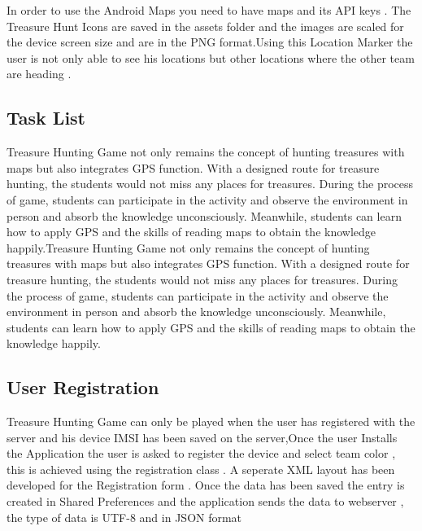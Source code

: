 \documentclass[11.4pt,a4paper,times]{report}
\begin{document}
In order to use the Android Maps you need to have maps and its API keys . The Treasure Hunt Icons are saved in the assets folder and the images are scaled for the device screen size and are in the PNG format.Using this Location Marker the user is not only able to see his locations but other locations where the other team are heading .




%

\subsection{Task List}

Treasure Hunting Game not only remains the concept of hunting treasures with maps but also integrates GPS function. With a designed route for treasure hunting, the students would not miss any places for treasures. During the process of game, students can participate in the activity and observe the environment in person and absorb the knowledge unconsciously. Meanwhile, students can learn how to apply GPS and the skills of reading maps to obtain the knowledge happily.Treasure Hunting Game not only remains the concept of hunting treasures with maps but also integrates GPS function. With a designed route for treasure hunting, the students would not miss any places for treasures. During the process of game, students can participate in the activity and observe the environment in person and absorb the knowledge unconsciously. Meanwhile, students can learn how to apply GPS and the skills of reading maps to obtain the knowledge happily.



%


\subsection{User Registration}

Treasure Hunting Game can only be played when the user has registered with the server and his device IMSI has been saved on the server,Once the user Installs the Application the user is asked to register the device and select team color , this is achieved using the registration class . A seperate XML layout has been developed for the Registration form . Once the data has been saved the entry is created in Shared Preferences and the application sends the data to webserver , the type of data is UTF-8 and in JSON format
\end{document}
